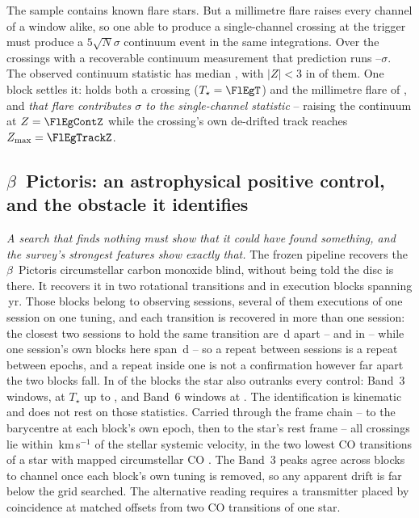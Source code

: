 The sample contains known flare stars. But a millimetre flare raises every
channel of a window alike, so one able to produce a single-channel crossing at
the trigger must produce a $5\sqrt{N}\sigma$ continuum event in the same
integrations. Over the \FlNCont{} crossings with a recoverable continuum measurement
that prediction runs \FlPredLo--\FlPredHi$\sigma$. The observed continuum
statistic has median \FlObsMed, with $|Z|<3$ in \FlNQuiet{} of them. One block settles it: \FlEgStar{} \texttt{\FlEgEb} holds both a
crossing ($T_\star=\FlEgT$) and the millimetre flare of
\citet{MacGregor2020}, and \emph{that flare contributes \FlEgContrib$\sigma$
to the single-channel statistic} -- raising the continuum at $Z=\FlEgContZ$
while the crossing's own de-drifted track reaches $Z_{\max}=\FlEgTrackZ$.

\subsection{$\beta$~Pictoris: an astrophysical positive control, and the
obstacle it identifies} \label{sec:bpicval}

\emph{A search that finds nothing must show that it could have found
something, and the survey's strongest features show exactly that.} The
frozen pipeline recovers the $\beta$~Pictoris circumstellar carbon monoxide
blind, without being told the disc is there. It recovers it in two
rotational transitions and in \CsBpCoBlocks{} execution
blocks spanning \BpBaselineYr\,yr. Those blocks belong to \CsBpCoSess{}
observing sessions, several of them executions of one session on one
tuning, and each transition is recovered in more than one session: the
closest two sessions to hold the same transition are \CsBpCoSepMinD\,d
apart -- \texttt{\NbSessEbOne} and \texttt{\NbSessEbTwo} in
\NbSessLine{} -- while one session's own blocks here span \QfBpSameSessD\,d
-- so a
repeat between sessions is a repeat between epochs, and a repeat inside one
is not a confirmation however far apart the two blocks fall.
In \NStageOneBpicEb{} of the blocks the star also outranks every control:
\BpicNFlagThree{} Band~3 windows, at $T_\star$ up to \BpicBThreeTsym, and
\BpicNFlagSix{} Band~6 windows at \BpicBSixTsym. The identification is kinematic and does not rest on those
statistics. Carried through the frame chain -- to the barycentre at each
block's own epoch, then to the star's rest frame -- all \BpicPanelNCo{}
crossings lie within \BpicDvCoHi\,km\,s$^{-1}$ of the stellar systemic
velocity, in the two lowest CO transitions of a star with mapped
circumstellar CO \citep{Dent2014,Matra2017}. The Band~3 peaks agree across blocks to
\BpRecThreeTuneChanMax{} channel once each block's own tuning is removed, so
any apparent drift is far below the grid searched. The alternative reading
requires a transmitter placed by coincidence at matched offsets from two CO
transitions of one star.

